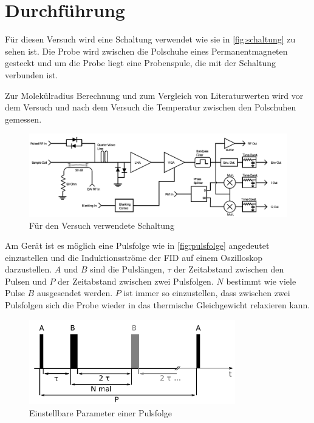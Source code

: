 \section{Durchführung}
\label{sec:Durchführung}

Für diesen Versuch wird eine Schaltung verwendet wie sie in \autoref{fig:schaltung} zu sehen ist.
Die Probe wird zwischen die Polschuhe eines Permanentmagneten gesteckt und um die Probe liegt eine Probenspule, die mit der Schaltung verbunden ist.

Zur Molekülradius Berechnung und zum Vergleich von Literaturwerten wird vor dem Versuch und nach dem Versuch die Temperatur zwischen den Polschuhen gemessen.

\begin{figure}
    \centering
    \includegraphics[width=\textwidth]{images/schaltung.png}
    \caption{Für den Versuch verwendete Schaltung \cite{teachspin}}
    \label{fig:schaltung}
\end{figure}

Am Gerät ist es möglich eine Pulsfolge wie in \autoref{fig:pulsfolge} angedeutet einzustellen und die Induktionsströme der FID auf einem Oszilloskop darzustellen.
$A$ und $B$ sind die Pulslängen, $\tau$ der Zeitabstand zwischen den Pulsen und $P$ der Zeitabstand zwischen zwei Pulsfolgen.
$N$ bestimmt wie viele Pulse $B$ ausgesendet werden.
$P$ ist immer so einzustellen, dass zwischen zwei Pulsfolgen sich die Probe wieder in das thermische Gleichgewicht relaxieren kann.

\begin{figure}
    \centering
    \includegraphics[width=0.8\textwidth]{images/pulsfolge.png}
    \caption{Einstellbare Parameter einer Pulsfolge \cite{V49}}
    \label{fig:pulsfolge}
\end{figure}

